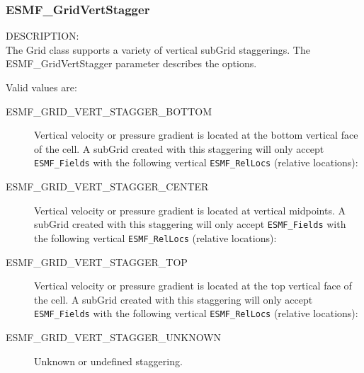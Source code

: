  \subsubsection{ESMF\_GridVertStagger}

 {\sf DESCRIPTION:\\}
 The Grid class supports a variety of vertical subGrid staggerings.  The
 {ESMF\_GridVertStagger} parameter describes the options.

 Valid values are:
 \begin{description}

    \item [ESMF\_GRID\_VERT\_STAGGER\_BOTTOM]
          Vertical velocity or pressure gradient is located at the bottom
          vertical face of the cell.  A subGrid created with this staggering
          will only accept {\tt ESMF\_Fields} with the following vertical
          {\tt ESMF\_RelLocs} (relative locations):

    \item [ESMF\_GRID\_VERT\_STAGGER\_CENTER] 
          Vertical velocity or pressure gradient is located at vertical
          midpoints.  A subGrid created with this staggering will only accept
          {\tt ESMF\_Fields} with the following vertical {\tt ESMF\_RelLocs}
          (relative locations):

    \item [ESMF\_GRID\_VERT\_STAGGER\_TOP]
          Vertical velocity or pressure gradient is located at the top vertical 
          face of the cell.  A subGrid created with this staggering will only
          accept {\tt ESMF\_Fields} with the following vertical
          {\tt ESMF\_RelLocs} (relative locations):

    \item [ESMF\_GRID\_VERT\_STAGGER\_UNKNOWN]
          Unknown or undefined staggering.

 \end{description}


